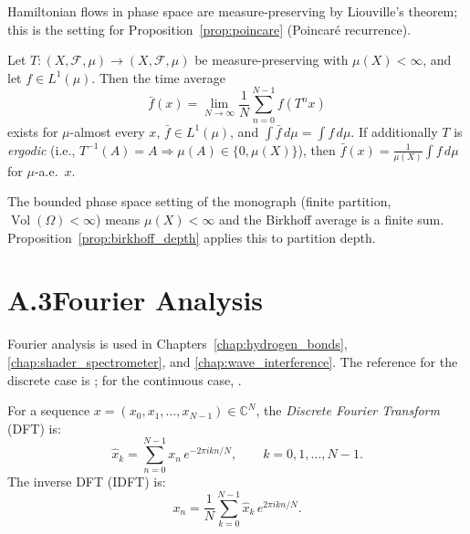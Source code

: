 Hamiltonian flows in phase space are measure-preserving by Liouville's theorem;
this is the setting for Proposition~\ref{prop:poincare} (Poincar\'{e} recurrence).

\begin{theorem}
Let $T : (X,\mathcal{F},\mu) \to (X,\mathcal{F},\mu)$ be measure-preserving
with $\mu(X) < \infty$, and let $f \in L^1(\mu)$. Then the time average
\[
  \bar{f}(x) = \lim_{N\to\infty} \frac{1}{N}\sum_{n=0}^{N-1} f(T^n x)
\]
exists for $\mu$-almost every $x$, $\bar{f} \in L^1(\mu)$, and
$\int \bar{f}\,d\mu = \int f\,d\mu$.
If additionally $T$ is \emph{ergodic} (i.e., $T^{-1}(A) = A \Rightarrow \mu(A) \in \{0, \mu(X)\}$),
then $\bar{f}(x) = \frac{1}{\mu(X)}\int f\,d\mu$ for $\mu$-a.e.\ $x$.
\end{theorem}

The bounded phase space setting of the monograph (finite partition,
$\operatorname{Vol}(\Omega) < \infty$) means $\mu(X) < \infty$ and the Birkhoff
average is a finite sum. Proposition~\ref{prop:birkhoff_depth} applies this
to partition depth.

\section*{A.3\quad Fourier Analysis}
\label{app:fourier}

Fourier analysis is used in Chapters~\ref{chap:hydrogen_bonds},
\ref{chap:shader_spectrometer}, and \ref{chap:wave_interference}. The
reference for the discrete case is \citet{oppenheim1999discrete}; for the
continuous case, \citet{rudin1987real}.

\begin{definition}
For a sequence $x = (x_0, x_1, \ldots, x_{N-1}) \in \mathbb{C}^N$, the
\emph{Discrete Fourier Transform} (DFT) is:
\begin{equation}
  \hat{x}_k = \sum_{n=0}^{N-1} x_n \, e^{-2\pi i kn / N}, \qquad k = 0, 1, \ldots, N-1.
  \label{eq:dft_def}
\end{equation}
The inverse DFT (IDFT) is:
\begin{equation}
  x_n = \frac{1}{N} \sum_{k=0}^{N-1} \hat{x}_k \, e^{2\pi i kn / N}.
  \label{eq:idft_def}
\end{equation}
\end{definition}

